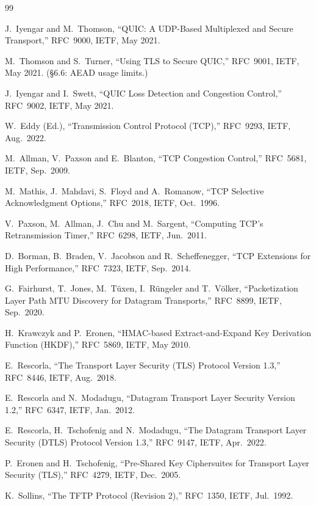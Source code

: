\begin{thebibliography}{99}

 J.~Iyengar and M.~Thomson, ``QUIC: A UDP-Based Multiplexed and Secure Transport,'' RFC~9000, IETF, May 2021.

 M.~Thomson and S.~Turner, ``Using TLS to Secure QUIC,'' RFC~9001, IETF, May 2021. (\S6.6: AEAD usage limits.)

 J.~Iyengar and I.~Swett, ``QUIC Loss Detection and Congestion Control,'' RFC~9002, IETF, May 2021.

 W.~Eddy (Ed.), ``Transmission Control Protocol (TCP),'' RFC~9293, IETF, Aug.\ 2022.

 M.~Allman, V.~Paxson and E.~Blanton, ``TCP Congestion Control,'' RFC~5681, IETF, Sep.\ 2009.

 M.~Mathis, J.~Mahdavi, S.~Floyd and A.~Romanow, ``TCP Selective Acknowledgment Options,'' RFC~2018, IETF, Oct.\ 1996.

 V.~Paxson, M.~Allman, J.~Chu and M.~Sargent, ``Computing TCP's Retransmission Timer,'' RFC~6298, IETF, Jun.\ 2011.

 D.~Borman, B.~Braden, V.~Jacobson and R.~Scheffenegger, ``TCP Extensions for High Performance,'' RFC~7323, IETF, Sep.\ 2014.

 G.~Fairhurst, T.~Jones, M.~T\"uxen, I.~R\"ungeler and T.~V\"olker, ``Packetization Layer Path MTU Discovery for Datagram Transports,'' RFC~8899, IETF, Sep.\ 2020.

 H.~Krawczyk and P.~Eronen, ``HMAC-based Extract-and-Expand Key Derivation Function (HKDF),'' RFC~5869, IETF, May 2010.

 E.~Rescorla, ``The Transport Layer Security (TLS) Protocol Version 1.3,'' RFC~8446, IETF, Aug.\ 2018.

 E.~Rescorla and N.~Modadugu, ``Datagram Transport Layer Security Version 1.2,'' RFC~6347, IETF, Jan.\ 2012.

 E.~Rescorla, H.~Tschofenig and N.~Modadugu, ``The Datagram Transport Layer Security (DTLS) Protocol Version 1.3,'' RFC~9147, IETF, Apr.\ 2022.

 P.~Eronen and H.~Tschofenig, ``Pre-Shared Key Ciphersuites for Transport Layer Security (TLS),'' RFC~4279, IETF, Dec.\ 2005.

 K.~Sollins, ``The TFTP Protocol (Revision 2),'' RFC~1350, IETF, Jul.\ 1992.


\end{thebibliography}

